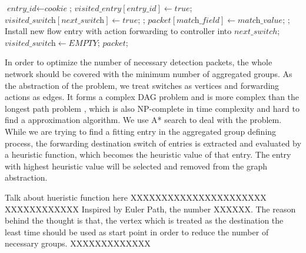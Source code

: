 \begin {tcolorbox}[blanker,float=tbp,
grow to left by=1cm, grow to right by=1cm]
\begin{algorithm}[H]
  \begin{algorithmic}[1]
        \State $\textit{entry\_id} \gets \textit{cookie}$;
          \State $\textit{visited\_entry}[\textit{entry\_id}] \gets true$;
          \State $\textit{visited\_switch}[\textit{next\_switch}] \gets true$;
            \State \Return {};
            \State $\textit{packet}[\textit{match\_field}] \gets \textit{match\_value}$;
            \State \Return {};
          \EndIf
        \EndIf
      \EndFor
      \State Install new flow entry with action forwarding to controller into $next\_switch$;
      \State $\textit{visited\_switch} \gets EMPTY$;
      \State \Return $packet$;
    \EndFunction
  \end{algorithmic}
\end{algorithm}
\end{tcolorbox}

In order to optimize the number of necessary detection packets, the whole network should be covered with the minimum number of aggregated groups. As the abstraction of the problem, we treat switches as vertices and forwarding actions as edges. It forms a complex DAG problem and is more complex than the longest path problem \cite{DMR97,RU04}, which is also NP-complete in time complexity and hard to find a approximation algorithm. We use A* search to deal with the problem. While we are trying to find a fitting entry in the aggregated group defining process, the forwarding destination switch of entries is extracted and evaluated by a heuristic function, which becomes the heuristic value of that entry. The entry with highest heuristic value will be selected and removed from the graph abstraction.

Talk about hueristic function here XXXXXXXXXXXXXXXXXXXXXX
XXXXXXXXXXXX Inspired by Euler Path, the number XXXXXX. The reason behind the thought is that, the vertex which is treated as the destination the least time should be used as start point in order to reduce the number of necessary groups.
XXXXXXXXXXXXX

